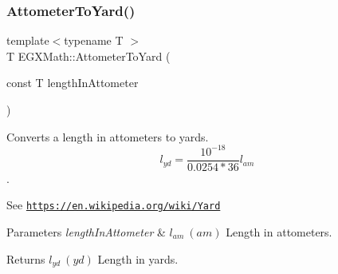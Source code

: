 \subsubsection{\texorpdfstring{Attometer\+To\+Yard()}{AttometerToYard()}}
{\footnotesize\ttfamily template$<$typename T $>$ \\
T E\+G\+X\+Math\+::\+Attometer\+To\+Yard (\begin{DoxyParamCaption}\item[{const T}]{length\+In\+Attometer }\end{DoxyParamCaption})}



Converts a length in attometers to yards. \[ l_{yd}= \frac{10^{-18}}{0.0254 * 36} l_{am} \]. 

See \href{https://en.wikipedia.org/wiki/Yard}{\tt https\+://en.\+wikipedia.\+org/wiki/\+Yard} 
\begin{DoxyParams}{Parameters}
{\em length\+In\+Attometer} & $ l_{am}\ (am)$ Length in attometers. \\
\hline
\end{DoxyParams}
\begin{DoxyReturn}{Returns}
$ l_{yd}\ (yd)$ Length in yards. 
\end{DoxyReturn}
